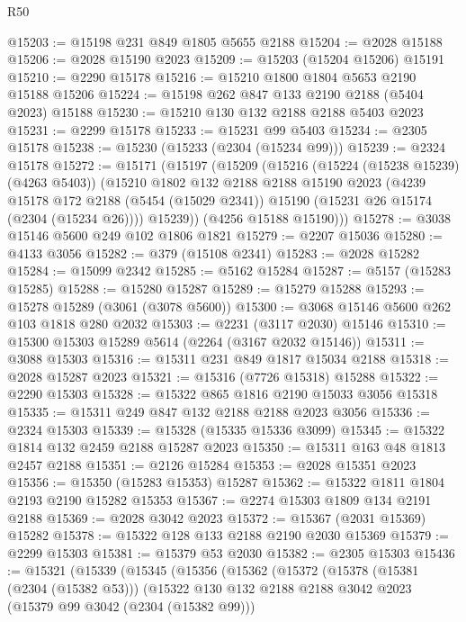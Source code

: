 \begin{lexlean}{R50}
\begin{coremodule}
@15203 := @15198 @231 @849 @1805 @5655 @2188
@15204 := @2028 @15188
@15206 := @2028 @15190 @2023
@15209 := @15203 (@15204 @15206) @15191
@15210 := @2290 @15178
@15216 := @15210 @1800 @1804 @5653 @2190 @15188 @15206
@15224 := @15198 @262 @847 @133 @2190 @2188 (@5404 @2023) @15188
@15230 := @15210 @130 @132 @2188 @2188 @5403 @2023
@15231 := @2299 @15178
@15233 := @15231 @99 @5403
@15234 := @2305 @15178
@15238 := @15230 (@15233 (@2304 (@15234 @99)))
@15239 := @2324 @15178
@15272 := @15171
    (@15197
      (@15209
        (@15216
          (@15224 (@15238 @15239) (@4263 @5403))
          (@15210
            @1802
            @132
            @2188
            @2188
            @15190
            @2023
            (@4239
              @15178
              @172
              @2188
              (@5454 (@15029 @2341))
              @15190
              (@15231 @26 @15174 (@2304 (@15234 @26))))
            @15239))
        (@4256 @15188 @15190)))
@15278 := @3038 @15146 @5600 @249 @102 @1806 @1821
@15279 := @2207 @15036
@15280 := @4133 @3056
@15282 := @379 (@15108 @2341)
@15283 := @2028 @15282
@15284 := @15099 @2342
@15285 := @5162 @15284
@15287 := @5157 (@15283 @15285)
@15288 := @15280 @15287
@15289 := @15279 @15288
@15293 := @15278 @15289 (@3061 (@3078 @5600))
@15300 := @3068 @15146 @5600 @262 @103 @1818 @280 @2032
@15303 := @2231 (@3117 @2030) @15146
@15310 := @15300 @15303 @15289 @5614 (@2264 (@3167 @2032 @15146))
@15311 := @3088 @15303
@15316 := @15311 @231 @849 @1817 @15034 @2188
@15318 := @2028 @15287 @2023
@15321 := @15316 (@7726 @15318) @15288
@15322 := @2290 @15303
@15328 := @15322 @865 @1816 @2190 @15033 @3056 @15318
@15335 := @15311 @249 @847 @132 @2188 @2188 @2023 @3056
@15336 := @2324 @15303
@15339 := @15328 (@15335 @15336 @3099)
@15345 := @15322 @1814 @132 @2459 @2188 @15287 @2023
@15350 := @15311 @163 @48 @1813 @2457 @2188
@15351 := @2126 @15284
@15353 := @2028 @15351 @2023
@15356 := @15350 (@15283 @15353) @15287
@15362 := @15322 @1811 @1804 @2193 @2190 @15282 @15353
@15367 := @2274 @15303 @1809 @134 @2191 @2188
@15369 := @2028 @3042 @2023
@15372 := @15367 (@2031 @15369) @15282
@15378 := @15322 @128 @133 @2188 @2190 @2030 @15369
@15379 := @2299 @15303
@15381 := @15379 @53 @2030
@15382 := @2305 @15303
@15436 := @15321
    (@15339
      (@15345
        (@15356
          (@15362
            (@15372
              (@15378
                (@15381 (@2304 (@15382 @53)))
                (@15322
                  @130
                  @132
                  @2188
                  @2188
                  @3042
                  @2023
                  (@15379 @99 @3042 (@2304 (@15382 @99)))

\end{coremodule}
\end{lexlean}
